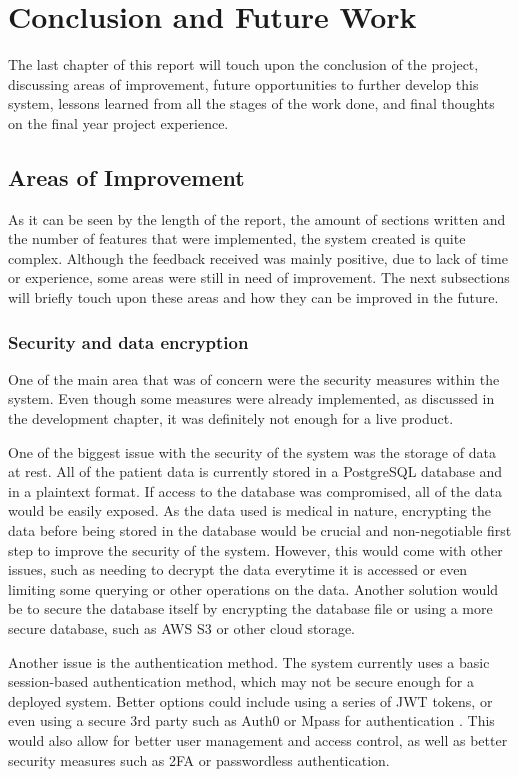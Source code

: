 \chapter{Conclusion and Future Work}

The last chapter of this report will touch upon the conclusion of the project, discussing areas of improvement, future opportunities to further develop this system, lessons learned from all the stages of the work done, and final thoughts on the final year project experience.

\section{Areas of Improvement}

As it can be seen by the length of the report, the amount of sections written and the number of features that were implemented, the system created is quite complex. Although the feedback received was mainly positive, due to lack of time or experience, some areas were still in need of improvement. The next subsections will briefly touch upon these areas and how they can be improved in the future.

\subsection{Security and data encryption}

One of the main area that was of concern were the security measures within the system. Even though some measures were already implemented, as discussed in the development chapter, it was definitely not enough for a live product. 

One of the biggest issue with the security of the system was the storage of data at rest. All of the patient data is currently stored in a PostgreSQL database and in a plaintext format. If access to the database was compromised, all of the data would be easily exposed. As the data used is medical in nature, encrypting the data before being stored in the database would be crucial and non-negotiable first step to improve the security of the system. However, this would come with other issues, such as needing to decrypt the data everytime it is accessed or even limiting some querying or other operations on the data. Another solution would be to secure the database itself by encrypting the database file or using a more secure database, such as AWS S3 or other cloud storage.

Another issue is the authentication method. The system currently uses a basic session-based authentication method, which may not be secure enough for a deployed system. Better options could include using a series of JWT tokens, or even using a secure 3rd party such as Auth0 or Mpass for authentication \parencite{auth0, mpass}. This would also allow for better user management and access control, as well as better security measures such as 2FA or passwordless authentication. 

